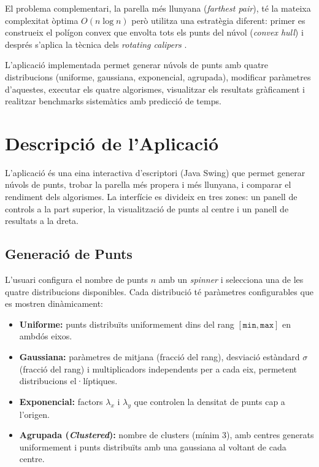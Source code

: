 \documentclass[conference,compsoc]{IEEEtran}
\begin{document}
El problema complementari, la parella més llunyana (\textit{farthest pair}),
té la mateixa complexitat òptima $O(n \log n)$ però utilitza una
estratègia diferent: primer es construeix el polígon convex que envolta
tots els punts del núvol (\textit{convex hull}) i després s'aplica la tècnica dels
\textit{rotating calipers} \cite{ref_gfg_convex}.

L'aplicació implementada permet generar núvols de punts amb quatre
distribucions (uniforme, gaussiana, exponencial, agrupada), modificar paràmetres d'aquestes,
executar els quatre algorismes, visualitzar els resultats gràficament i
realitzar benchmarks sistemàtics amb predicció de temps.

\section{Descripció de l'Aplicació}

L'aplicació és una eina interactiva d'escriptori (Java Swing) que
permet generar núvols de punts, trobar la parella més propera i més
llunyana, i comparar el rendiment dels algorismes. La interfície es
divideix en tres zones: un panell de controls a la part superior,
la visualització de punts al centre i un panell de resultats a la dreta.

\subsection{Generació de Punts}

L'usuari configura el nombre de punts $n$
amb un \textit{spinner} i selecciona una de les quatre distribucions
disponibles. Cada distribució té paràmetres configurables que es
mostren dinàmicament:

\begin{itemize}
    \item \textbf{Uniforme:} punts distribuïts uniformement dins del
          rang $[\texttt{min}, \texttt{max}]$ en ambdós eixos.
    \item \textbf{Gaussiana:} paràmetres de mitjana (fracció del rang),
          desviació estàndard $\sigma$ (fracció del rang) i multiplicadors
          independents per a cada eix, permetent distribucions
          el·líptiques.
    \item \textbf{Exponencial:} factors $\lambda_x$ i $\lambda_y$ que
          controlen la densitat de punts cap a l'origen.
    \item \textbf{Agrupada (\textit{Clustered}):} nombre de clusters
          (mínim 3), amb centres generats uniformement i punts
          distribuïts amb una gaussiana al voltant de cada centre.
\end{itemize}
\end{document}
